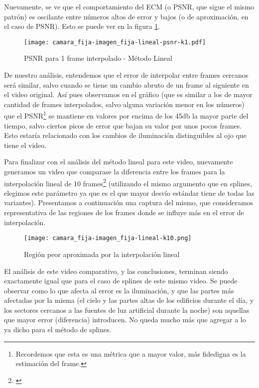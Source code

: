 \par Nuevamente, se ve que el comportamiento del ECM (o PSNR, que sigue el
mismo patr\'on) es oscilante entre n\'umeros altos de error y bajos (o de
aproximaci\'on, en el caso de PSNR). Esto se puede ver en la figura
\ref{fig:fija-fija_lineal-psnr-k1}.

\begin{figure}
    \centering
    \texttt{[image: camara\_fija-imagen\_fija-lineal-psnr-k1.pdf]}
    \caption{PSNR para 1 frame interpolado - M\'etodo Lineal}
    \label{fig:fija-fija_lineal-psnr-k1}
\end{figure}

\par De nuestro an\'alisis, entendemos que el error de interpolar entre frames
cercanos ser\'a similar, salvo cuando se tiene un cambio abruto de un frame al
siguiente en el video original. As\'i pues observamos en el gr\'afico (que es
similar a los de mayor cantidad de frames interpolados, salvo alguna
variaci\'on menor en los n\'umeros) que el PSNR\footnote{Recordemos que esta es
una m\'etrica que a mayor valor, m\'as fidedigna es la estimaci\'on del frame.}
se mantiene en valores por encima de los 45db la mayor parte del tiempo, salvo
ciertos picos de error que bajan su valor por unos pocos frames. Esto estar\'ia
relacionado con los cambios de iluminaci\'on distinguibles al ojo que tiene el
video.

\par Para finalizar con el an\'alisis del m\'etodo lineal para este video,
nuevamente generamos un video que comparase la diferencia entre los frames para
la interpolaci\'on lineal de 10 frames\footnote{\url{}} (utilizando el mismo
argumento que en splines, elegimos este par\'ametro ya que es el que mayor
desv\'io est\'andar tiene de todas las variantes). Presentamos a continuaci\'on
una captura del mismo, que consideramos representativa de las regiones de los
frames donde se influye m\'as en el error de interpolaci\'on.

\begin{figure}[H]
    \centering
    \texttt{[image: camara\_fija-imagen\_fija-lineal-k10.png]}
    \label{fig:fija-fija_lineal-heatmap}
    \caption{Regi\'on peor aproximada por la interpolaci\'on lineal}
\end{figure}

\par El an\'alisis de este video comparativo, y las conclusiones, terminan
siendo exactamente igual que para el caso de splines de este mismo video. Se
puede observar como lo que afecta al error es la iluminaci\'on, y que las
partes m\'as afectadas por la misma (el cielo y las partes altas de los
edificios durante el d\'ia, y los sectores cercanos a las fuentes de luz
artificial durante la noche) son aquellas que mayor error (diferencia)
introducen. No queda mucho m\'as que agregar a lo ya dicho para el m\'etodo de
splines.

